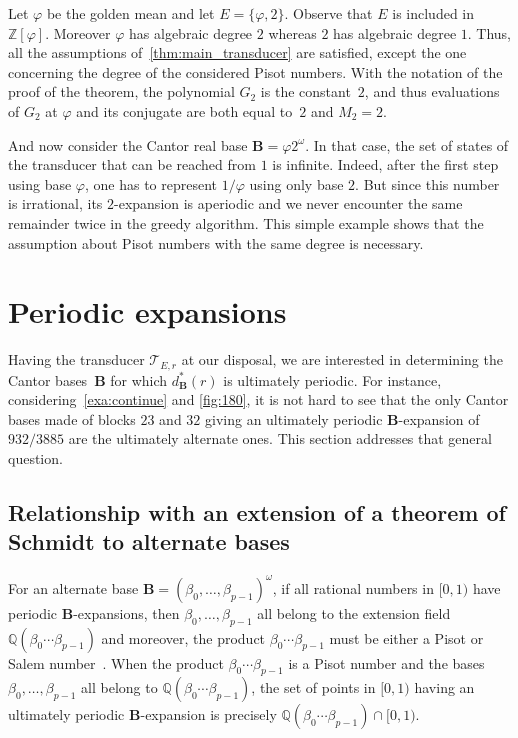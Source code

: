 \documentclass[12pt,reqno]{amsart}
\newcommand{\B}{{\mathbf{B}}}
\begin{document}
\begin{example}
    Let $\varphi$ be the golden mean and let $E=\{\varphi,2\}$. Observe that $E$ is included in $\mathbb{Z}[\varphi]$. Moreover $\varphi$ has algebraic degree $2$ whereas $2$ has algebraic degree $1$. Thus, all the assumptions of~\cref{thm:main_transducer} are satisfied, except the one concerning the degree of the considered Pisot numbers. With the notation of the proof of the theorem, the polynomial $G_2$ is the constant~$2$, and thus evaluations of $G_2$ at $\varphi$ and its conjugate are both equal to~$2$ and $M_2=2$. 
    
    And now consider the Cantor real base $\B=\varphi2^{\omega}$. In that case, the set of states of the transducer that can be reached from $1$ is infinite. Indeed, after the first step using base $\varphi$, one has to represent $1/\varphi$ using only base $2$. But since this number is irrational, its $2$-expansion is aperiodic and we never encounter the same remainder twice in the greedy algorithm. This simple example shows that the assumption about Pisot numbers with the same degree is necessary. 
\end{example}








\section{Periodic expansions}

Having the transducer $\mathcal{T}_{E,r}$ at our disposal, we are interested in determining the Cantor bases~$\B$ for which $d_\B^*(r)$ is ultimately periodic. For instance, considering~\cref{exa:continue} and \cref{fig:180}, it is not hard to see that the only Cantor bases made of blocks $23$ and $32$ giving an ultimately periodic $\B$-expansion of $932/3885$ are the ultimately alternate ones. This section addresses that general question.


\subsection{Relationship with an extension of a theorem of Schmidt to alternate bases}

For an alternate base $\B=(\beta_0,\ldots,\beta_{p-1})^\omega$, if all rational numbers in $[0,1)$ have periodic $\B$-expansions, then $\beta_0,\ldots,\beta_{p-1}$ all belong to the extension field $\mathbb{Q}(\beta_0\cdots\beta_{p-1})$ and moreover, the product $\beta_0\cdots\beta_{p-1}$ must be either a Pisot or Salem number~\cite{CCK,MP}. When the product $\beta_0\cdots\beta_{p-1}$ is a Pisot number and the bases $\beta_0,\ldots,\beta_{p-1}$ all belong to $\mathbb{Q}(\beta_0\cdots\beta_{p-1})$, the set of points in $[0,1)$ having an ultimately periodic $\B$-expansion is precisely $\mathbb{Q}(\beta_0\cdots\beta_{p-1})\cap [0,1)$. 
\end{document}
